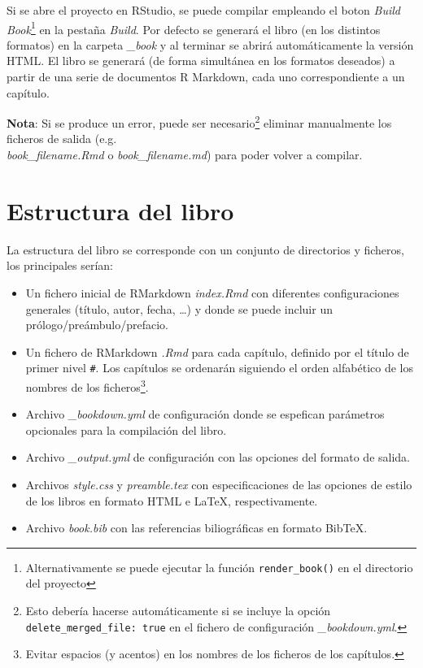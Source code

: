 \documentclass[]{book}
\let\rmarkdownfootnote\footnote%
\def\footnote{\protect\rmarkdownfootnote}
\theoremstyle{definition}
\theoremstyle{definition}
\theoremstyle{definition}
\theoremstyle{remark}
\begin{document}
Si se abre el proyecto en RStudio, se puede compilar empleando el boton
\emph{Build Book}\footnote{Alternativamente se puede ejecutar la función
  \texttt{render\_book()} en el directorio del proyecto} en la pestaña
\emph{Build}. Por defecto se generará el libro (en los distintos
formatos) en la carpeta \emph{\_book} y al terminar se abrirá
automáticamente la versión HTML. El libro se generará (de forma
simultánea en los formatos deseados) a partir de una serie de documentos
R Markdown, cada uno correspondiente a un capítulo.

\textbf{Nota}: Si se produce un error, puede ser necesario\footnote{Esto
  debería hacerse automáticamente si se incluye la opción
  \texttt{delete\_merged\_file:\ true} en el fichero de configuración
  \emph{\_bookdown.yml}.} eliminar manualmente los ficheros de salida
(e.g.\\
\emph{book\_filename.Rmd} o \emph{book\_filename.md}) para poder volver
a compilar.

\section{Estructura del libro}\label{estructura-del-libro}

La estructura del libro se corresponde con un conjunto de directorios y
ficheros, los principales serían:

\begin{itemize}
\item
  Un fichero inicial de RMarkdown \emph{index.Rmd} con diferentes
  configuraciones generales (título, autor, fecha, \ldots{}) y donde se
  puede incluir un prólogo/preámbulo/prefacio.
\item
  Un fichero de RMarkdown \emph{.Rmd} para cada capítulo, definido por
  el título de primer nivel \texttt{\#}. Los capítulos se ordenarán
  siguiendo el orden alfabético de los nombres de los ficheros\footnote{Evitar
    espacios (y acentos) en los nombres de los ficheros de los
    capítulos.}.
\item
  Archivo \emph{\_bookdown.yml} de configuración donde se espefican
  parámetros opcionales para la compilación del libro.
\item
  Archivo \emph{\_output.yml} de configuración con las opciones del
  formato de salida.
\item
  Archivos \emph{style.css} y \emph{preamble.tex} con especificaciones
  de las opciones de estilo de los libros en formato HTML e LaTeX,
  respectivamente.
\item
  Archivo \emph{book.bib} con las referencias biliográficas en formato
  BibTeX.
\end{itemize}
\end{document}
